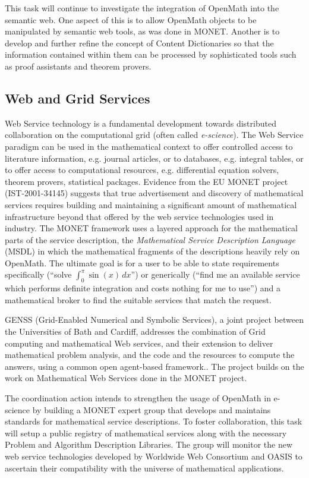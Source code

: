 \documentclass{euproposal}
\begin{document}
This task will continue to investigate the integration of OpenMath
into the semantic web.  One aspect of this is to allow OpenMath
objects to be manipulated by semantic web tools, as was done in MONET.
Another is to develop and further refine the concept of Content
Dictionaries so that the information contained within them can be
processed by sophisticated tools such as proof assistants and theorem
provers.

\subsection{Web and Grid Services}



Web Service technology is a fundamental development towards
distributed collaboration on the computational grid (often called
\emph{e-science}).  The Web Service paradigm can be used in the
mathematical context to offer controlled access to literature
information, e.g. journal articles, or to databases, e.g.  integral
tables, or to offer access to computational resources, e.g.
differential equation solvers, theorem provers, statistical packages.
Evidence from the EU MONET project (IST-2001-34145) suggests that true
advertisement and discovery of mathematical services requires building
and maintaining a significant amount of mathematical infrastructure
beyond that offered by the web service technologies used in industry.
The MONET framework uses a layered approach for the mathematical parts
of the service description, the \emph{Mathematical Service Description
  Language} (MSDL) in which the mathematical fragments of the
descriptions heavily rely on OpenMath.  The ultimate goal is for a
user to be able to state requirements specifically (``solve
$\int_0^\pi{}\sin(x)\,dx$'') or generically (``find me an available
service which performs definite integration and costs nothing for me
to use'') and a mathematical broker to find the suitable services that
match the request.

GENSS (Grid-Enabled Numerical and Symbolic Services), a joint project
between the Universities of Bath and Cardiff, addresses the
combination of Grid computing and mathematical Web services, and their
extension to deliver mathematical problem analysis, and the code and
the resources to compute the answers, using a common open agent-based
framework.. The project builds on the work on Mathematical Web
Services done in the MONET project.

The coordination action intends to strengthen the usage of OpenMath in
e-science by building a MONET expert group that develops and
maintains standards for mathematical service descriptions. To foster
collaboration, this task will setup a public registry of mathematical
services along with the necessary Problem and Algorithm Description
Libraries.  The group will monitor the new web service technologies
developed by Worldwide Web Consortium and OASIS to ascertain their
compatibility with the universe of mathematical applications.
\end{document}
